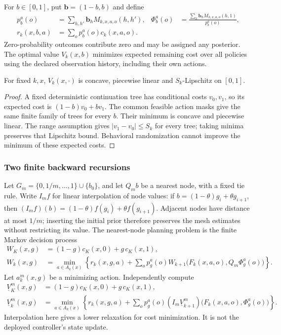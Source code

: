 For $b\in[0,1]$, put $\boldsymbol b=(1-b,b)$ and define
\begin{align}\label{eq:finitebeliefkernel}
 p_b^a(o)&=\sum_{h,h'}\boldsymbol b_h M_{k,x,a,o}(h,h'),&
 \Phi_b^a(o)&=\frac{\sum_h\boldsymbol b_h M_{k,x,a,o}(h,1)}{p_b^a(o)},\\
 r_k(x,b,a)&=\sum_o p_b^a(o)c_k(x,a,o).\nonumber
\end{align}
Zero-probability outcomes contribute zero and may be assigned any posterior.
The optimal value $V_k(x,b)$ minimizes expected remaining cost over all
policies using the declared observation history, including their own actions.

\begin{lemma}\label{lem:beliefmodulus}
For fixed $k,x$, $V_k(x,\cdot)$ is concave, piecewise linear and
$S_k$-Lipschitz on $[0,1]$.
\end{lemma}
\begin{proof}
A fixed deterministic continuation tree has conditional costs $v_0,v_1$,
so its expected cost is $(1-b)v_0+bv_1$. The common feasible action masks
give the same finite family of trees for every $b$. Their minimum is concave
and piecewise linear. The range assumption gives $|v_1-v_0|\le S_k$ for
every tree; taking minima preserves that Lipschitz bound. Behavioral
randomization cannot improve the minimum of these expected costs.
\end{proof}

\subsubsection*{Two finite backward recursions}

Let $G_m=\{0,1/m,\ldots,1\}\cup\{b_0\}$, and let $Q_m b$ be a
nearest node, with a fixed tie rule. Write $I_m f$ for linear interpolation
of node values: if $b=(1-\theta)g_i+\theta g_{i+1}$, then
$(I_m f)(b)=(1-\theta)f(g_i)+\theta f(g_{i+1})$.
Adjacent nodes have distance at most $1/m$; inserting the initial prior
therefore preserves the mesh estimates without restricting its value.
The nearest-node planning problem is the finite Markov decision process
\begin{align}\label{eq:nearestbeliefdp}
 W_K(x,g)&=(1-g)c_K(x,0)+g\,c_K(x,1),\nonumber\\
 W_k(x,g)&=\min_{a\in A_k(x)}\left\{
 r_k(x,g,a)+\sum_o p_g^a(o)
 W_{k+1}\bigl(F_k(x,a,o),Q_m\Phi_g^a(o)\bigr)\right\}.
\end{align}
Let $a_k^m(x,g)$ be a minimizing action. Independently compute
\begin{align}\label{eq:belieflowerdp}
 \underline V_K^m(x,g)&=(1-g)c_K(x,0)+g\,c_K(x,1),\nonumber\\
 \underline V_k^m(x,g)&=\min_{a\in A_k(x)}\left\{
 r_k(x,g,a)+\sum_o p_g^a(o)
 (I_m\underline V_{k+1}^m)\bigl(F_k(x,a,o),\Phi_g^a(o)\bigr)\right\}.
\end{align}
Interpolation here gives a lower relaxation for cost minimization. It is
not the deployed controller's state update.


